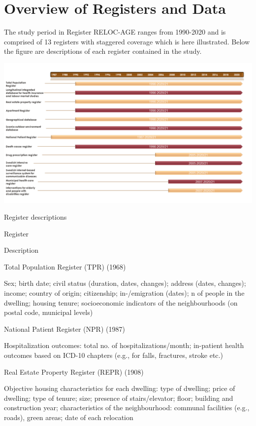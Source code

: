 \documentclass[
]{book}
\begin{document}
\hypertarget{overview-of-registers-and-data}{%
\chapter{Overview of Registers and Data}\label{overview-of-registers-and-data}}

The study period in Register RELOC-AGE ranges from 1990-2020 and is comprised of 13 registers with staggered coverage which is here illustrated. Below the figure are descriptions of each register contained in the study.

\includegraphics[width=1\linewidth]{output/figures/timeline_registers_update}

\label{tab:unnamed-chunk-3}Register descriptions

Register

Description

Total Population Register (TPR) (1968)

Sex; birth date; civil status (duration, dates, changes); address (dates, changes); income; country of origin; citizenship; in-/emigration (dates); n of people in the dwelling; housing tenure; socioeconomic indicators of the neighbourhoods (on postal code, municipal levels)

National Patient Register (NPR) (1987)

Hospitalization outcomes: total no. of hospitalizations/month; in-patient health outcomes based on ICD-10 chapters (e.g., for falls, fractures, stroke etc.)

Real Estate Property Register (REPR) (1908)

Objective housing characteristics for each dwelling: type of dwelling; price of dwelling; type of tenure; size; presence of stairs/elevator; floor; building and construction year; characteristics of the neighbourhood: communal facilities (e.g., roads), green areas; date of each relocation
\end{document}
